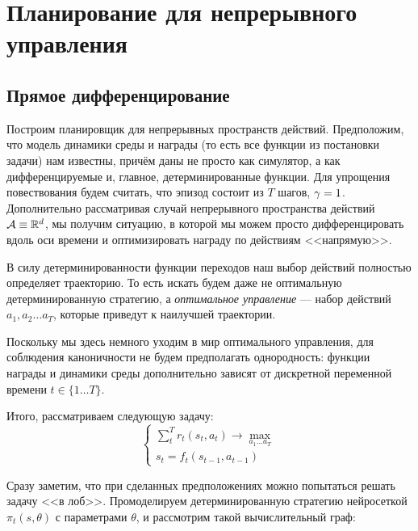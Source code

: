 \section{Планирование для непрерывного управления}\label{lqrsection}

\subsection{Прямое дифференцирование}


Построим планировщик для непрерывных пространств действий. Предположим, что модель динамики среды и награды (то есть все функции из постановки задачи) нам известны, причём даны не просто как симулятор, а как дифференцируемые и, главное, детерминированные функции. Для упрощения повествования будем считать, что эпизод состоит из $T$ шагов, $\gamma \HM= 1$. Дополнительно рассматривая случай непрерывного пространства действий $\A \HM\equiv \R^d$, мы получим ситуацию, в которой мы можем просто дифференцировать вдоль оси времени и оптимизировать награду по действиям <<напрямую>>.

В силу детерминированности функции переходов наш выбор действий полностью определяет траекторию. То есть искать будем даже не оптимальную детерминированную стратегию, а \emph{оптимальное управление} --- набор действий $a_1, a_2 \dots a_T$, которые приведут к наилучшей траектории. 

Поскольку мы здесь немного уходим в мир оптимального управления, для соблюдения каноничности не будем предполагать однородность: функции награды и динамики среды дополнительно зависят от дискретной переменной времени $t \in \{1 \dots T\}$. 

Итого, рассматриваем следующую задачу:
\begin{equation}\label{LQRtask}
\begin{cases}
\sum_t^T r_t(s_t, a_t) \to \max\limits_{a_1 \dots a_T} \\
s_t = f_t(s_{t-1}, a_{t-1})
\end{cases}
\end{equation}

Сразу заметим, что при сделанных предположениях можно попытаться решать задачу <<в лоб>>. Промоделируем детерминированную стратегию  нейросеткой $\pi_t(s, \theta)$ с параметрами $\theta$, и рассмотрим такой вычислительный граф:

